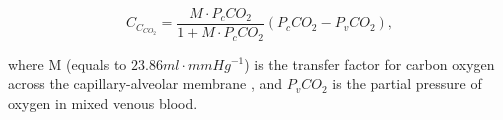 \begin{equation} 
 \label{eq:CarbonOxygenContent}
 C_{C_{CO_2}} = \frac{M \cdot P_cCO_2}{1+M \cdot P_cCO_2}(P_cCO_2 - P_vCO_2),
\end{equation}

\noindent where M (equals to $23.86 ml \cdot mmHg^{-1}$) is the transfer factor for carbon oxygen across the capillary-alveolar membrane \citep{chakraborty2004diffusing}, and $P_vCO_2$ is the partial pressure of oxygen in mixed venous blood.

%
%
%
%
%
%
